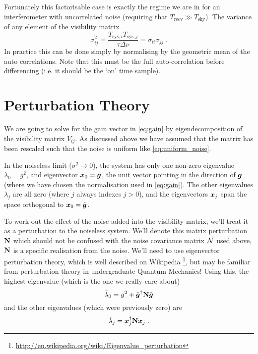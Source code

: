 \documentclass[oldfontcommands,letter,11pt,oneside,article]{memoir}
\begin{document}
Fortunately this factorisable case is exactly the regime we are in for an
interferometer with uncorrelated noise (requiring that $T_\text{recv} \gg
T_\text{sky}$). The variance of any element of the visibility matrix
\begin{equation}
    \sigma_{ij}^2 = \frac{T_{\text{sys},i} T_{\text{sys},j}}{\tau \Delta\nu} = \sigma_{ii} \sigma_{jj} \; .
\end{equation}
In practice this can be done simply by normalising by the geometric mean of the
auto correlations. Note that this must be the full auto-correlation before
differencing (i.e. it should be the `on' time sample).


\section*{Perturbation Theory}

We are going to solve for the gain vector in \eqref{eq:gain} by
eigendecomposition of the visibility matrix $V_{ij}$. As discussed above we have
assumed that the matrix has been rescaled such that the noise is uniform like
\eqref{eq:uniform_noise}.

In the noiseless limit ($\sigma^2 \rightarrow 0$), the system has only one
non-zero eigenvalue $\lambda_0 = g^2$, and eigenvector $\boldsymbol{x}_0 = \hat{\boldsymbol{g}}$, the unit
vector pointing in the direction of $\boldsymbol{g}$ (where we have chosen the
normalisation used in \eqref{eq:gain}). The other eigenvalues $\lambda_j$ are
all zero (where $j$ always indexes $j > 0$), and the eigenvectors $\boldsymbol{x}_j$ span
the space orthogonal to $\boldsymbol{x}_0 = \hat{\boldsymbol{g}}$.

To work out the effect of the noise added into the visibility matrix, we'll
treat it as a perturbation to the noiseless system. We'll denote this matrix
perturbation $\boldsymbol{\mathbf{N}}$ which should not be confused with the noise covariance matrix
$\mathcal{N}$ used above, $\boldsymbol{\mathbf{N}}$ is a specific realisation from the noise. We'll need
to use eigenvector perturbation theory, which is well described on Wikipedia
\footnote{\url{http://en.wikipedia.org/wiki/Eigenvalue_perturbation}}, but may
be familiar from perturbation theory in undergraduate Quantum Mechanics! Using
this, the highest eigenvalue (which is the one we really care about)
\begin{equation}
\tilde{\lambda}_0 = g^2 + \hat{\boldsymbol{g}}^{\dagger} \boldsymbol{\mathbf{N}} \hat{\boldsymbol{g}}
\end{equation}
and the other eigenvalues (which were previously zero) are
\begin{equation}
\tilde{\lambda}_j = \boldsymbol{x}_j^{\dagger} \boldsymbol{\mathbf{N}} \boldsymbol{x}_j \; .
\end{equation}
\end{document}
